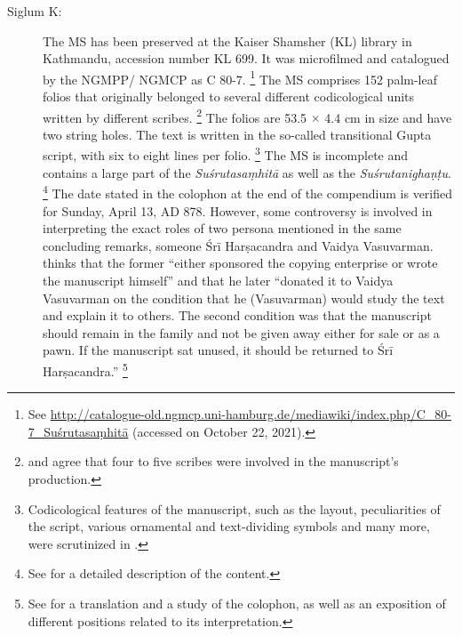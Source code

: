 \begin{description}
\item[Siglum K:] The MS has been preserved at the Kaiser Shamsher (KL) library in Kathmandu, accession number KL 699. It was microfilmed and catalogued by the NGMPP/ NGMCP as C 80-7.%
    \footnote{%
    See 
    \url{http://catalogue-old.ngmcp.uni-hamburg.de/mediawiki/index.php/C_80-7_Suśrutasaṃhitā}
     (accessed on October 22, 2021).%
    } 
The MS comprises 152 palm-leaf folios that originally belonged to several different codicological units written by different scribes.%
    \footnote{%
    \textcites[46]{bhat-2020} and \textcites[11]{kleb-2021b} agree that four to five scribes were involved in the manuscript's production.
    } 
The folios are 53.5 $\times$ 4.4 cm in size and have two string holes.  The text is written in the so-called transitional Gupta script, with six to eight lines per folio.%
    \footnote{%
    Codicological features of the manuscript, such as the layout, peculiarities of the script, various ornamental and text-dividing symbols and many more, were scrutinized in \textcites{bhat-2020}.
    }
The MS is incomplete and contains a large part of the \emph{Suśrutasaṃhitā} as well as the \emph{Suśrutanighaṇṭu}.%
    \footnote{%
    See \textcites[11]{kleb-2021b} for a detailed description of the content.%
    }
The date stated in the colophon at the end of the compendium is verified for Sunday, April 13, AD 878. However, some controversy is involved in interpreting the exact roles of two persona mentioned in the same concluding remarks, someone Śrī Harṣacandra and Vaidya Vasuvarman.
\textcites[16]{kleb-2021b} thinks that the former “either sponsored the copying enterprise or wrote the manuscript himself” and that he later “donated it to Vaidya Vasuvarman on the condition that he (Vasuvarman) would study the text and explain it to others. The second condition was that the manuscript should remain in the family and not be given away either for sale or as a pawn. If the manuscript sat unused, it should be returned to Śrī Harṣacandra.”%
    \footnote{%
    See \textcites[13--17]{kleb-2021b} for a translation and a study of the colophon, as well as an exposition of different positions related to its interpretation.%
    }


\end{description}
